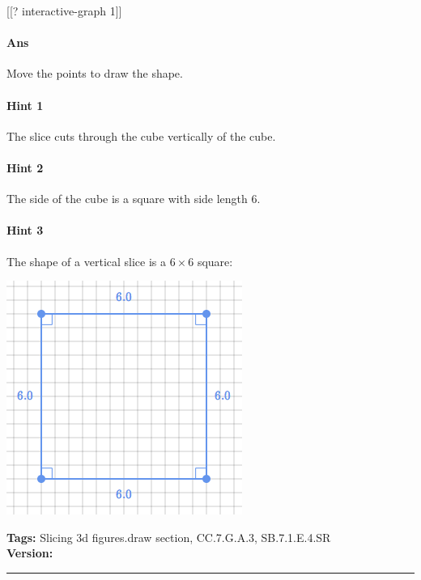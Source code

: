 \documentclass[twocolumn,10pt]{article}
\def\shrinkfactor{0.4}
\begin{document}
[[? interactive-graph 1]] 


\paragraph{Ans} Move the points to draw the shape. 

\paragraph{Hint 1}The slice cuts through the cube vertically \DIFdelbegin {}\DIFdelend \DIFaddbegin {}\DIFaddend of the cube.

\paragraph{Hint 2}The side of the cube is a square with side length $6$.

\paragraph{Hint 3}The shape of a vertical slice \DIFdelbegin {}\DIFdelend \DIFaddbegin {}\DIFaddend is a $6 \times 6$ square:   

\includegraphics[scale=\shrinkfactor]{figures/17941d59a646cbfd163d76d74fb932b7b62b27c8.png}



\medskip
\noindent
\textbf{Tags:} {\footnotesize Slicing 3d figures.draw section, CC.7.G.A.3, SB.7.1.E.4.SR}\\
\textbf{Version:} \DIFdelbegin {}\DIFdelend \DIFaddbegin {}\DIFaddend \smallskip\hrule
\end{document}
